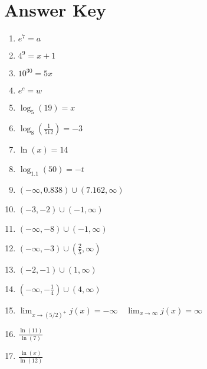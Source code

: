 \newpage

\section{Answer Key}

\begin{enumerate}
	\item $e^7 = a$
    \item $4^9 = x+1$
    \item $10^{30} = 5x$
    \item $e^c = w$
    \item $\log_5(19) = x$
    \item $\log_8\left(\frac{1}{512}\right) = -3$
    \item $\ln(x) = 14$
    \item $\log_{1.1}(50) = -t$

	\item $(-\infty, 0.838) \cup (7.162, \infty)$
    \item $(-3, -2) \cup (-1, \infty)$
    \item $(-\infty, -8) \cup (-1, \infty)$
    \item $(-\infty, -3) \cup \left(\frac{2}{5}, \infty\right)$
    \item $(-2, -1) \cup (1, \infty)$
    \item $\left(-\infty, -\frac{1}{4}\right) \cup (4, \infty)$
    \item $\displaystyle\lim_{x \to (5/2)^+} j(x) = -\infty \quad \lim_{x \to \infty} j(x) = \infty$ 
    
    \item $\frac{\ln(11)}{\ln(7)}$
    \item $\frac{\ln(x)}{\ln(12)}$
\end{enumerate}
